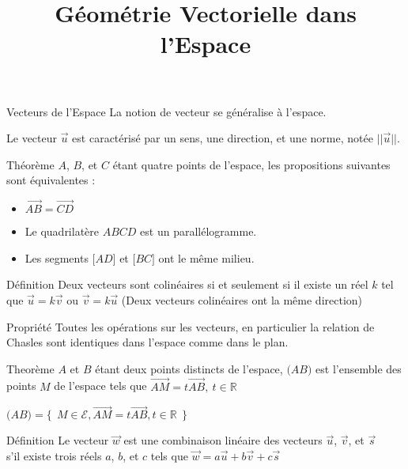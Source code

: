 \documentclass{cours}
\title{Géométrie Vectorielle dans l'Espace}
\begin{document}

    \begin{Gpartie}{Vecteurs de l'Espace} 
        La notion de vecteur se généralise à l'espace.

        Le vecteur $\vec{u}$ est caractérisé par un sens, une direction, et une norme, notée $\lvert\lvert{\vec{u}}\rvert\rvert$.
        \begin{Spartie}{Théorème} 
            $A$, $B$, et $C$ étant quatre points de l'espace, les propositions suivantes sont équivalentes :
            \begin{itemize}
                \item $\overrightarrow{AB}=\overrightarrow{CD}$
                \item Le quadrilatère $ABCD$ est un parallélogramme.
                \item Les segments $\big[AD\big]$ et $\big[BC\big]$ ont le même milieu.
            \end{itemize}
        \end{Spartie}
        \begin{Spartie}{Définition} 
            Deux vecteurs sont colinéaires si et seulement si il existe un réel $k$ tel que $\vec{u}=k\vec{v}$ ou $\vec{v}=k\vec{u}$ (Deux vecteurs colinéaires ont la même direction)
        \end{Spartie}
        \begin{Spartie}{Propriété} 
            Toutes les opérations sur les vecteurs, en particulier la relation de Chasles sont identiques dans l'espace comme dans le plan.
        \end{Spartie}
        \begin{Spartie}{Theorème} 
            $A$ et $B$ étant deux points distincts de l'espace, $\big(AB\big)$ est l'ensemble des points $M$ de l'espace tels que $\overrightarrow{AM}=t \overrightarrow{AB},\ t\in\mathbb{R}$

            $\big(AB\big)=\big\{\ \ M\in\mathcal{E},\overrightarrow{AM}=t \overrightarrow{AB},t\in\mathbb{R}\ \ \big\}$
        \end{Spartie}
        \begin{Spartie}{Définition} 
            Le vecteur $\vec{w}$ est une combinaison linéaire des vecteurs $\vec{u}$, $\vec{v}$, et $\vec{s}$ \\ s'il existe trois réels $a$, $b$, et $c$ tels que $\vec{w}=a\vec{u}+b\vec{v}+c\vec{s}$
        \end{Spartie}
    \end{Gpartie}
\end{document}

